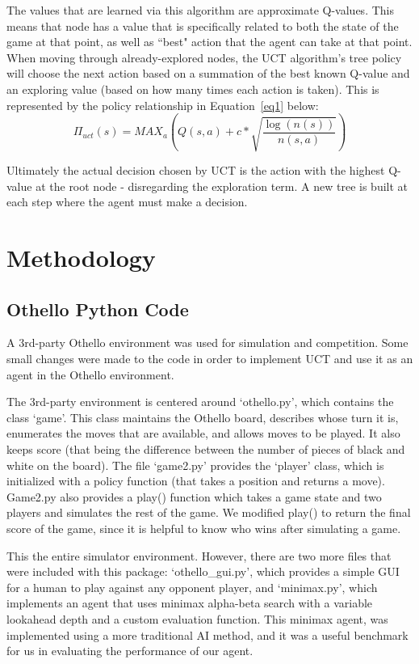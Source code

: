 \documentclass[12pt,letterpaper]{article}
\begin{document}
The values that are learned via this algorithm are approximate Q-values.  This means that node has a value that is specifically related to both the state of the game at that point, as well as ``best" action that the agent can take at that point. When moving through already-explored nodes, the UCT algorithm's tree policy will choose the next action based on a summation of the best known Q-value and an exploring value (based on how many times each action is taken).  This is represented by the policy relationship in Equation~\ref{eq1} below:
\begin{equation}
\label{eq1}
\Pi_{uct}(s) = MAX_a \left( Q(s,a) + c*\sqrt{\frac{\log(n(s))}{n(s,a)}} \right)
\end{equation}

Ultimately the actual decision chosen by UCT is the action with the highest Q-value at the root node - disregarding the exploration term. A new tree is built at each step where the agent must make a decision.

\pagebreak
\section{Methodology}
\label{meth}

\subsection{Othello Python Code}

A 3rd-party Othello environment was used for simulation and competition. Some small changes were made to the code in order to implement UCT and use it as an agent in the Othello environment.

The 3rd-party environment is centered around `othello.py', which contains the class `game'. This class maintains the Othello board, describes whose turn it is, enumerates the moves that are available, and allows moves to be played. It also keeps score (that being the difference between the number of pieces of black and white on the board). The file `game2.py' provides the `player' class, which is initialized with a policy function (that takes a position and returns a move). Game2.py also provides a play() function which takes a game state and two players and simulates the rest of the game. We modified play() to return the final score of the game, since it is helpful to know who wins after simulating a game. 

This the entire simulator environment. However, there are two more files that were included with this package: `othello\_gui.py', which provides a simple GUI for a human to play against any opponent player, and `minimax.py', which implements an agent that uses minimax alpha-beta search with a variable lookahead depth and a custom evaluation function. This minimax agent, was implemented using a more traditional AI method, and it was a useful benchmark for us in evaluating the performance of our agent.
\end{document}
